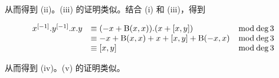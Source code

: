 从而得到 (ii)。(iii) 的证明类似。结合 (i) 和 (iii)，得到

\[
\begin{array}{r l r} x ^ {[ - 1 ]}. y ^ {[ - 1 ]}. x. y & \equiv (- x + \mathrm{B} (x, x)). (x + [ x, y ]) & \bmod \deg 3 \\ & \equiv - x + \mathrm{B} (x, x) + x + [ x, y ] + \mathrm{B} (- x, x) & \bmod \deg 3 \\ & \equiv [ x, y ] & \bmod \deg 3 \end{array}
\]

从而得到 (iv)。(v) 的证明类似。

